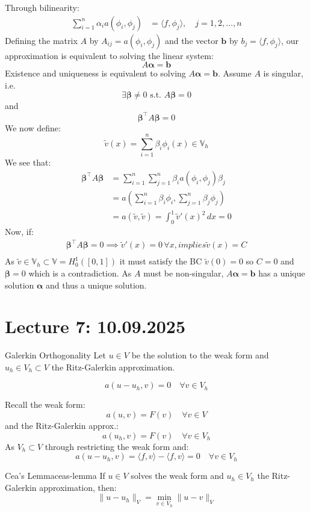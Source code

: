 Through bilinearity:
\begin{align*}
    \sum_{i=1}^n \alpha_i a(\phi_i, \phi_j) & = \langle f, \phi_j \rangle, \quad j = 1, 2, \ldots, n
\end{align*}
Defining the matrix $A$ by $A_{ij} = a(\phi_i, \phi_j)$ and the vector $\mathbf{b}$ by $b_j = \langle f, \phi_j \rangle$, our approximation is equivalent to solving the linear system:
\[A \symbf{\alpha} = \mathbf{b}\]
Existence and uniqueness is equivalent to solving $A \symbf{\alpha} = \mathbf{b}$.
Assume $A$ is singular, i.e.
\[
    \exists \symbf{\beta} \neq 0 \text{ s.t. } A \symbf{\beta} = 0
\]
and
\[
    \symbf{\beta}^\top A \symbf{\beta} = 0
\]
We now define:
\[
    \tilde{v}(x) = \sum_{i=1}^n \beta_i \phi_i(x) \in \mathbb{V}_h
\]
We see that:
\begin{align*}
    \symbf{\beta}^\top A \symbf{\beta} & = \sum_{i=1}^n \sum_{j=1}^n \beta_i a(\phi_i, \phi_j) \beta_j \\
                                       & = a(\sum_{i=1}^n \beta_i \phi_i, \sum_{j=1}^n \beta_j \phi_j) \\
                                       & = a(\tilde{v}, \tilde{v})= \int_0^1 \tilde{v}'(x)^2 \, dx = 0
\end{align*}
Now, if:
\begin{align*}
    \symbf{\beta}^\top A \symbf{\beta} = 0 \implies \tilde{v}'(x) = 0 \, \forall x, implies \tilde{v}(x) = C \\
\end{align*}
As $\tilde{v} \in \mathbb{V}_h \subset \mathbb{V} = H^1_0([0, 1])$ it must satisfy the BC $\tilde{v}(0) = 0$ so $C = 0$ and $\symbf{\beta} = 0$ which is a contradiction.
As $A$ must be non-singular, $A \symbf{\alpha} = \mathbf{b}$ has a unique solution $\symbf{\alpha}$ and thus a unique solution.

\section{Lecture 7: 10.09.2025}
\begin{lemma}{Galerkin Orthogonality}{}
    Let $u \in V$ be the solution to the weak form and $u_h \in V_h \subset V$ the Ritz-Galerkin approximation.

    \[
        a(u - u_h, v) = 0 \quad \forall v \in V_h
    \]
\end{lemma}
Recall the weak form:
\[
    a(u, v) = F(v) \quad \forall v \in V
\]
and the Ritz-Galerkin approx.:
\[
    a(u_h, v) = F(v) \quad \forall v \in V_h
\]
As $V_h \subset V$ through restricting the weak form and:
\[
    a(u - u_h, v) = \langle f, v \rangle - \langle f, v \rangle = 0 \quad \forall v \in V_h
\]
\begin{lemma}{Cea's Lemma}{ceas-lemma}
    If $u \in V$ solves the weak form and $u_h \in V_h$ the Ritz-Galerkin approximation, then:
    \[
        \|u - u_h\|_V = \min_{v \in V_h} \|u - v\|_V
    \]
\end{lemma}

